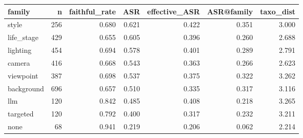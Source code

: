 \begin{tabular}{lrrrrrr}
\toprule
family & n & faithful_rate & ASR & effective_ASR & ASR@family & taxo_dist \\
\midrule
style & 256 & 0.680 & 0.621 & 0.422 & 0.351 & 3.000 \\
life_stage & 429 & 0.655 & 0.605 & 0.396 & 0.260 & 2.688 \\
lighting & 454 & 0.694 & 0.578 & 0.401 & 0.289 & 2.791 \\
camera & 416 & 0.668 & 0.543 & 0.363 & 0.266 & 2.623 \\
viewpoint & 387 & 0.698 & 0.537 & 0.375 & 0.322 & 3.262 \\
background & 696 & 0.657 & 0.510 & 0.335 & 0.317 & 3.116 \\
llm & 120 & 0.842 & 0.485 & 0.408 & 0.218 & 3.265 \\
targeted & 120 & 0.792 & 0.400 & 0.317 & 0.232 & 3.211 \\
none & 68 & 0.941 & 0.219 & 0.206 & 0.062 & 2.214 \\
\bottomrule
\end{tabular}
